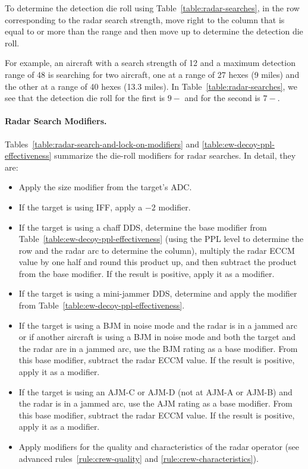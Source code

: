 {To determine the detection die roll using Table~\ref{table:radar-searches}, in the row corresponding to the radar search strength, move right to the column that is equal to or more than the range and then move up to determine the detection die roll.

For example, an aircraft with a search strength of 12 and a maximum detection range of 48 is searching for two aircraft, one at a range of 27 hexes (9 miles) and the other at a range of 40 hexes (13.3 miles). In Table~\ref{table:radar-searches}, we see that the detection die roll for the first is $9-$ and for the second is $7-$.


\paragraph{Radar Search Modifiers.} Tables~\ref{table:radar-search-and-lock-on-modifiers} and \ref{table:ew-decoy-ppl-effectiveness} summarize the die-roll modifiers for radar searches. In detail, they are:
\begin{itemize}
    \item Apply the size modifier from the target’s ADC.
    \item If the target is using IFF, apply a $-2$ modifier.
    \item If the target is using a chaff DDS, determine the base modifier from Table~\ref{table:ew-decoy-ppl-effectiveness} (using the PPL level to determine the row and the radar arc to determine the column), multiply the radar ECCM value by one half and round this product up, and then subtract the product from the base modifier. If the result is positive, apply it as a modifier.
    \item If the target is using a mini-jammer DDS, determine and apply the modifier from Table~\ref{table:ew-decoy-ppl-effectiveness}.
    \item If the target is using a BJM in noise mode and the radar is in a jammed arc or if another aircraft is using a BJM in noise mode and both the target and the radar are in a jammed arc, use the BJM rating as a base modifier. From this base modifier, subtract the radar ECCM value. If the result is positive, apply it as a modifier.
    \item If the target is using an AJM-C or AJM-D (not at AJM-A or AJM-B) and the radar is in a jammed arc, use the AJM rating as a base modifier. From this base modifier, subtract the radar ECCM value. If the result is positive, apply it as a modifier.
    \item Apply modifiers for the quality and characteristics of the radar operator (see advanced rules~\ref{rule:crew-quality} and \ref{rule:crew-characteristics}). 
\end{itemize}



}

